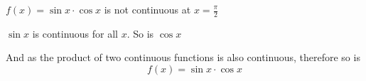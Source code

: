 \documentclass[14pt,fleqn]{extarticle}
\begin{document}
 
\begin{snippet}
    \incorrect
    $f(x) = \sin x\cdot \cos x$ is not continuous at $x = \frac{\pi}{2}$ 
    
    \reason
    
    $\sin x$ is continuous for all $x$. So is $\cos x$\newline 
    
    And as the product of two continuous functions is also continuous, 
    therefore so is \[ \qquad f(x) = \sin x\cdot \cos x \]
\end{snippet} 
\end{document}
